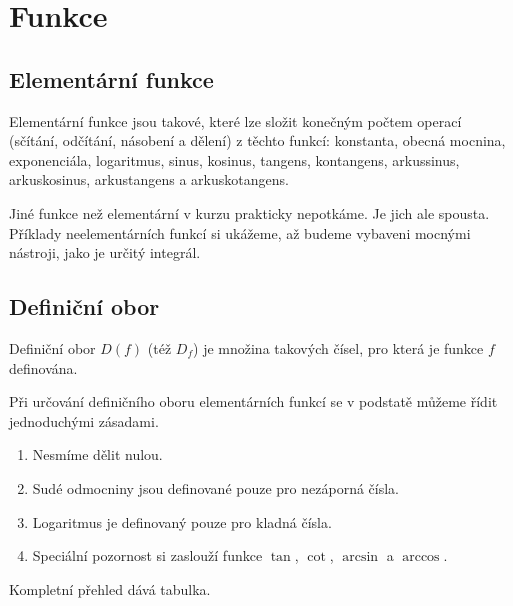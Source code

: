 \section{Funkce}

\subsection{Elementární funkce}

Elementární funkce jsou takové, které lze složit konečným počtem operací (sčítání, odčítání, násobení a dělení) z těchto funkcí: konstanta, obecná mocnina, exponenciála, logaritmus, sinus, kosinus, tangens, kontangens, arkussinus, arkuskosinus, arkustangens a arkuskotangens. 

Jiné funkce než elementární v kurzu prakticky nepotkáme. Je jich ale spousta. Příklady neelementárních funkcí si ukážeme, až budeme vybaveni mocnými nástroji, jako je určitý integrál.

\subsection{Definiční obor}

Definiční obor $D(f)$ (též $D_f$) je množina takových čísel, pro která je funkce $f$ definována.

Při určování definičního oboru elementárních funkcí se v podstatě můžeme řídit jednoduchými zásadami.

\begin{enumerate}
    \item Nesmíme dělit nulou.
    \item Sudé odmocniny jsou definované pouze pro nezáporná čísla.
    \item Logaritmus je definovaný pouze pro kladná čísla.
    \item Speciální pozornost si zaslouží funkce $\tan$, $\cot$, $\arcsin$ a $\arccos$.
\end{enumerate}

Kompletní přehled dává tabulka.

